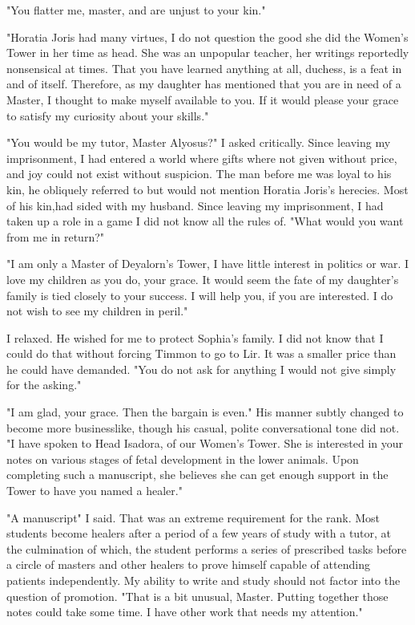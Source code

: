 \documentclass{article}
\begin{document}
"You flatter me, master, and are unjust to your kin." 

"Horatia Joris had many virtues, I do not question the good she did the Women's Tower in her time as head. She was an unpopular teacher, her writings reportedly nonsensical at times. That you have learned anything at all, duchess, is a feat in and of itself. Therefore, as my daughter has mentioned that you are in need of a Master, I thought to make myself available to you. If it would please your grace to satisfy my curiosity about your skills."

"You would be my tutor, Master Alyosus?" I asked critically. Since leaving my imprisonment, I had entered a world where gifts where not given without price, and joy could not exist without suspicion. The man before me was loyal to his kin, he obliquely referred to but would not mention Horatia Joris's herecies. Most of his  kin,had sided with my husband. Since leaving my imprisonment, I had taken up a role in a game I did not know all the rules of. "What would you want from me in return?"

"I am only a Master of Deyalorn's Tower, I have little interest in politics or war. I love my children as you do, your grace. It would seem the fate of my daughter's family is tied closely to your success. I will help you, if you are interested. I do not wish to see my children in peril."

I relaxed. He wished for me to protect Sophia's family. I did not know that I could do that without forcing Timmon to go to Lir. It was a smaller price than he could have demanded. "You do not ask for anything I would not give simply for the asking."

"I am glad, your grace. Then the bargain is even." His manner subtly changed to become more businesslike, though his casual, polite conversational tone did not. "I have spoken to Head Isadora, of our Women's Tower. She is interested in your notes on various stages of fetal development in the lower animals. Upon completing such a manuscript, she believes she can get enough support in the Tower to have you named a healer." 

"A manuscript" I said. That was an extreme requirement for the rank. Most students become healers after a period of a few years of study with a tutor, at the culmination of which, the student performs a series of prescribed tasks before a circle of masters and other healers to prove himself capable of attending patients independently. My ability to write and study should not factor into the question of promotion. "That is a bit unusual, Master. Putting together those notes could take some time. I have other work that needs my attention."
\end{document}
